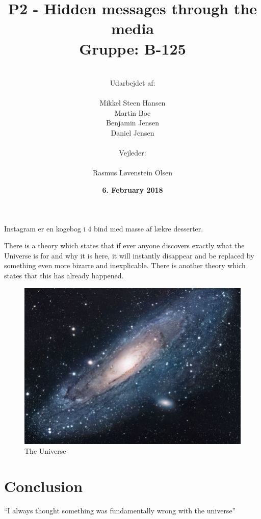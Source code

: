 \documentclass[11pt]{article}
\title{P2 - Hidden messages through the media \\ Gruppe: B-125}
\author{
    \\
    Udarbejdet af:\\
    \\
    Mikkel Steen Hansen\\
    Martin Boe\\
    Benjamin Jensen\\
    Daniel Jensen\\
    \\
    Vejleder:\\ 
    \\
    Rasmus Løvenstein Olsen\\
}
\date{\textbf{ 6. February 2018}}
\renewcommand{\baselinestretch}{1.20}
\begin{document}
\begin{titlepage}
\clearpage
\maketitle
\thispagestyle{empty}

\end{titlepage}

\renewcommand{\baselinestretch}{0.8} 
\tableofcontents
\renewcommand{\baselinestretch}{1.20} 
\newpage



Instagram er en kogebog i 4 bind med masse af lækre desserter.

There is a theory which states that if ever anyone discovers exactly what the Universe is for and why it is here, it will instantly disappear and be replaced by something even more bizarre and inexplicable.
There is another theory which states that this has already happened. \citep{adams1995hitchhiker2}

\begin{figure}[h!]
\centering
\includegraphics[scale=1.7]{universe.jpg}
\caption{The Universe}
\label{fig:univerise}
\end{figure}

\section{Conclusion}
``I always thought something was fundamentally wrong with the universe'' \citep{adams1995hitchhiker}



\end{document}
